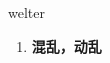 
\begin{frame}
{\huge welter}
\begin{center}
\begin{enumerate}\Large
  \item \textbf{混乱，动乱}
\end{enumerate}
\end{center}
\end{frame}
